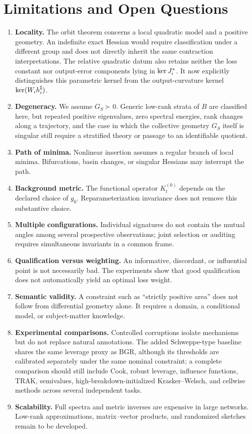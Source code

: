 \section{Limitations and Open Questions}
\begin{enumerate}
  \item \textbf{Locality.} The orbit theorem concerns a local quadratic model and a positive geometry. An indefinite exact Hessian would require classification under a different group and does not directly inherit the same contraction interpretations. The relative quadratic datum also retains neither the loss constant nor output-error components lying in $\operatorname{ker} J_i^*$. It now explicitly distinguishes this parametric kernel from the output-curvature kernel $\operatorname{ker}(W_i h_i^\sharp)$.
  \item \textbf{Degeneracy.} We assume $G_S\succ0$. Generic low-rank strata of $B$ are classified here, but repeated positive eigenvalues, zero spectral energies, rank changes along a trajectory, and the case in which the collective geometry $G_S$ itself is singular still require a stratified theory or passage to an identifiable quotient.
  \item \textbf{Path of minima.} Nonlinear insertion assumes a regular branch of local minima. Bifurcations, basin changes, or singular Hessians may interrupt the path.
  \item \textbf{Background metric.} The functional operator $K_t^{(0)}$ depends on the declared choice of $g_0$. Reparameterization invariance does not remove this substantive choice.
  \item \textbf{Multiple configurations.} Individual signatures do not contain the mutual angles among several prospective observations; joint selection or auditing requires simultaneous invariants in a common frame.
  \item \textbf{Qualification versus weighting.} An informative, discordant, or influential point is not necessarily bad. The experiments show that good qualification does not automatically yield an optimal loss weight.
  \item \textbf{Semantic validity.} A constraint such as ``strictly positive area'' does not follow from differential geometry alone. It requires a domain, a conditional model, or subject-matter knowledge.
  \item \textbf{Experimental comparisons.} Controlled corruptions isolate mechanisms but do not replace natural annotations. The added Schweppe-type baseline shares the same leverage proxy as BGR, although its thresholds are calibrated separately under the same nominal constraint; a complete comparison should still include Cook, robust leverage, influence functions, TRAK, semivalues, high-breakdown-initialized Krasker--Welsch, and cellwise methods across several independent tasks.
  \item \textbf{Scalability.} Full spectra and metric inverses are expensive in large networks. Low-rank approximations, matrix--vector products, and randomized sketches remain to be developed.
\end{enumerate}

